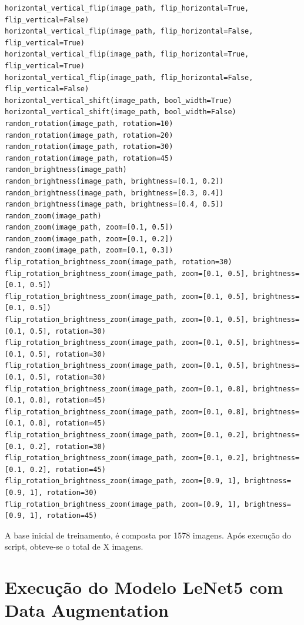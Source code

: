 \documentclass[12pt]{article}
\begin{document}
\begin{lstlisting}[caption={Funções Executadas},captionpos=b,frame=single,label={code:data_autmentation_executed}]
horizontal_vertical_flip(image_path, flip_horizontal=True, flip_vertical=False)
horizontal_vertical_flip(image_path, flip_horizontal=False, flip_vertical=True)
horizontal_vertical_flip(image_path, flip_horizontal=True, flip_vertical=True)
horizontal_vertical_flip(image_path, flip_horizontal=False, flip_vertical=False)
horizontal_vertical_shift(image_path, bool_width=True)
horizontal_vertical_shift(image_path, bool_width=False)
random_rotation(image_path, rotation=10)
random_rotation(image_path, rotation=20)
random_rotation(image_path, rotation=30)
random_rotation(image_path, rotation=45)
random_brightness(image_path)
random_brightness(image_path, brightness=[0.1, 0.2])
random_brightness(image_path, brightness=[0.3, 0.4])
random_brightness(image_path, brightness=[0.4, 0.5])
random_zoom(image_path)
random_zoom(image_path, zoom=[0.1, 0.5])
random_zoom(image_path, zoom=[0.1, 0.2])
random_zoom(image_path, zoom=[0.1, 0.3])
flip_rotation_brightness_zoom(image_path, rotation=30)
flip_rotation_brightness_zoom(image_path, zoom=[0.1, 0.5], brightness=[0.1, 0.5])
flip_rotation_brightness_zoom(image_path, zoom=[0.1, 0.5], brightness=[0.1, 0.5])
flip_rotation_brightness_zoom(image_path, zoom=[0.1, 0.5], brightness=[0.1, 0.5], rotation=30)
flip_rotation_brightness_zoom(image_path, zoom=[0.1, 0.5], brightness=[0.1, 0.5], rotation=30)
flip_rotation_brightness_zoom(image_path, zoom=[0.1, 0.5], brightness=[0.1, 0.5], rotation=30)
flip_rotation_brightness_zoom(image_path, zoom=[0.1, 0.8], brightness=[0.1, 0.8], rotation=45)
flip_rotation_brightness_zoom(image_path, zoom=[0.1, 0.8], brightness=[0.1, 0.8], rotation=45)
flip_rotation_brightness_zoom(image_path, zoom=[0.1, 0.2], brightness=[0.1, 0.2], rotation=30)
flip_rotation_brightness_zoom(image_path, zoom=[0.1, 0.2], brightness=[0.1, 0.2], rotation=45)
flip_rotation_brightness_zoom(image_path, zoom=[0.9, 1], brightness=[0.9, 1], rotation=30)
flip_rotation_brightness_zoom(image_path, zoom=[0.9, 1], brightness=[0.9, 1], rotation=45)
  \end{lstlisting}

A base inicial de treinamento, é composta por 1578 imagens. Após execução do script, obteve-se o total de X imagens.

\section{Execução do Modelo LeNet5 com Data Augmentation}
\end{document}
